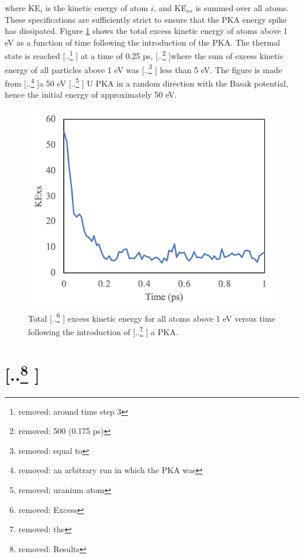 \documentclass[review]{elsarticle} %
\providecommand{\DIFaddtex}[1]{{\protect\color{blue} \sf #1}} %
\providecommand{\DIFdeltex}[1]{{\protect\color{red} [..\footnote{removed: #1} ]}} %
\providecommand{\DIFaddbegin}{} %
\providecommand{\DIFaddend}{} %
\providecommand{\DIFdelbegin}{} %
\providecommand{\DIFdelend}{} %
\providecommand{\DIFaddFL}[1]{\DIFadd{#1}} %
\providecommand{\DIFdelFL}[1]{\DIFdel{#1}} %
\providecommand{\DIFaddbeginFL}{} %
\providecommand{\DIFaddendFL}{} %
\providecommand{\DIFdelbeginFL}{} %
\providecommand{\DIFdelendFL}{} %
\providecommand{\DIFadd}[1]{\texorpdfstring{\DIFaddtex{#1}}{#1}} %
\providecommand{\DIFdel}[1]{\texorpdfstring{\DIFdeltex{#1}}{}} %
\newcommand{\DIFscaledelfig}{0.5}
\newlength{\DIFdelgraphicswidth} %
\newlength{\DIFdelgraphicsheight} %
\newcommand{\DIFaddincludegraphics}[2][]{{\color{blue}\fbox{\DIFOincludegraphics[#1]{#2}}}} %
\newcommand{\DIFdelincludegraphics}[2][]{%
\sbox{\DIFdelgraphicsbox}{\DIFOincludegraphics[#1]{#2}}%
\settoboxwidth{\DIFdelgraphicswidth}{\DIFdelgraphicsbox} %
\settoboxtotalheight{\DIFdelgraphicsheight}{\DIFdelgraphicsbox} %
\scalebox{\DIFscaledelfig}{%
\parbox[b]{\DIFdelgraphicswidth}{\usebox{\DIFdelgraphicsbox}\\[-\baselineskip] \rule{\DIFdelgraphicswidth}{0em}}\llap{\resizebox{\DIFdelgraphicswidth}{\DIFdelgraphicsheight}{%
\setlength{\unitlength}{\DIFdelgraphicswidth}%
\begin{picture}(1,1)%
\thicklines\linethickness{2pt} %
{\color[rgb]{1,0,0}\put(0,0){\framebox(1,1){}}}%
{\color[rgb]{1,0,0}\put(0,0){\line( 1,1){1}}}%
{\color[rgb]{1,0,0}\put(0,1){\line(1,-1){1}}}%
\end{picture}%
}\hspace*{3pt}}} %
} %
\DeclareRobustCommand{\DIFaddbegin}{\DIFOaddbegin \let\includegraphics\DIFaddincludegraphics} %
\DeclareRobustCommand{\DIFaddend}{\DIFOaddend \let\includegraphics\DIFOincludegraphics} %
\DeclareRobustCommand{\DIFdelbegin}{\DIFOdelbegin \let\includegraphics\DIFdelincludegraphics} %
\DeclareRobustCommand{\DIFdelend}{\DIFOaddend \let\includegraphics\DIFOincludegraphics} %
\DeclareRobustCommand{\DIFaddbeginFL}{\DIFOaddbeginFL \let\includegraphics\DIFaddincludegraphics} %
\DeclareRobustCommand{\DIFaddendFL}{\DIFOaddendFL \let\includegraphics\DIFOincludegraphics} %
\DeclareRobustCommand{\DIFdelbeginFL}{\DIFOdelbeginFL \let\includegraphics\DIFdelincludegraphics} %
\DeclareRobustCommand{\DIFdelendFL}{\DIFOaddendFL \let\includegraphics\DIFOincludegraphics} %
\begin{document}
\DIFadd{where KE$_i$ is the kinetic energy of atom $i$, and KE$_{xs}$ is summed over all atoms}\DIFaddend . These specifications are sufficiently strict to ensure that the PKA energy spike has dissipated. Figure \ref{fig:KE} shows the total excess kinetic energy of atoms above 1 eV as a function of time following the introduction of the PKA. The thermal state is reached \DIFdelbegin \DIFdel{around time step 3}\DIFdelend \DIFaddbegin \DIFadd{at a time of 0.25 ps}\DIFaddend , \DIFdelbegin \DIFdel{500 (0.175 ps) }\DIFdelend where the sum of excess kinetic energy of all particles above 1 eV was \DIFdelbegin \DIFdel{equal to }\DIFdelend \DIFaddbegin \DIFadd{less than }\DIFaddend 5 eV. The figure is made from \DIFdelbegin \DIFdel{an arbitrary run in which the PKA was }\DIFdelend a 50 eV \DIFdelbegin \DIFdel{uranium atom}\DIFdelend \DIFaddbegin \DIFadd{U PKA in a random direction with the Basak potential}\DIFaddend , hence the initial energy of approximately 50 eV.

\DIFdelbegin %
\DIFdelendFL \DIFaddbeginFL \begin{figure}[h]
\DIFaddendFL \centering
	\DIFdelbeginFL %
\DIFdelendFL \DIFaddbeginFL \includegraphics[width=0.6\linewidth]{KExs.png}
	\DIFaddendFL \caption{Total \DIFdelbeginFL \DIFdelFL{Excess }\DIFdelendFL \DIFaddbeginFL \DIFaddFL{excess }\DIFaddendFL kinetic energy for all atoms above 1 eV versus time following the introduction of \DIFdelbeginFL \DIFdelFL{the }\DIFdelendFL \DIFaddbeginFL \DIFaddFL{a }\DIFaddendFL PKA.}
	\label{fig:KE}
\end{figure}

\DIFdelbegin \section{\DIFdel{Results}}
\addtocounter{section}{-1}%
\DIFdelend \DIFaddbegin \FloatBarrier
\DIFaddend 
\end{document}
